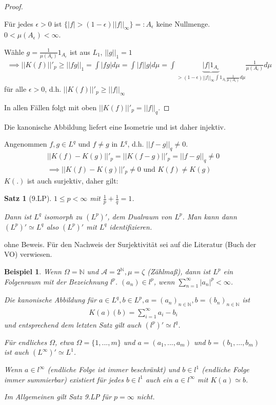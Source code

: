 \documentclass[]{article}
\newtheorem{theorem}{Satz}
\newtheorem*{example}{Beispiel}
\begin{document}
\begin{proof}
\begin{enumerate}
		Für jedes $\epsilon > 0$ ist $\{|f| > (1-\epsilon) ||f||_\infty\}=:A_\epsilon$ keine Nullmenge. $0 < \mu(A_\epsilon) < \infty$.
		
		Wähle $g=\frac{1}{\mu(A_\epsilon)}1_{A_\epsilon}$ ist aus $L_1$, $||g||_1=1$
		\begin{align*}
			\implies ||K(f)||'_p \geq ||fg||_1 = \int |fg| d\mu = \int |f| |g| d\mu = \int \underbrace{|f| 1_{A_\epsilon}}_{>(1-\epsilon)||f||_\infty \int 1_{A_\epsilon} \frac{1}{\mu(A_\epsilon)} d\mu} \frac{1}{\mu(A_\epsilon)} d\mu
		\end{align*}
		für alle $\epsilon > 0$, d.h. $||K(f)||'_p \geq ||f||_\infty$
	\end{enumerate}
	In allen Fällen folgt mit oben $||K(f)||'_p = ||f||_q$.

\end{proof}

Die kanonische Abbildung liefert eine Isometrie und ist daher injektiv.

Angenommen $f,g \in L^q$ und $f\neq g$ in $L^q$, d.h. $||f-g||_q \neq 0$.
\begin{align*}
	||K(f)-K(g)||'_p = ||K(f-g)||'_p = ||f-g||_q \neq 0\\
	\implies ||K(f)-K(g)||'_p \neq 0 \text{ und } K(f) \neq K(g)
\end{align*}
$K(.)$ ist auch surjektiv, daher gilt:

\begin{theorem}[9.LP]
	$1\leq p < \infty$ mit $\frac{1}{p} + \frac{1}{q} = 1$.
	
	Dann ist $L^q$ isomorph zu $(L^p)'$, dem Dualraum von $L^p$. Man kann dann $(L^p)' \simeq L^q$ also $(L^p)'$ mit $L^q$ identifizieren.
\end{theorem}

ohne Beweis. Für den Nachweis der Surjektivität sei auf die Literatur (Buch der VO) verwiesen.

\begin{example}
	Wenn $\Omega = \mathbb{N}$ und $\mathcal{A}=2^\mathbb{N}, \mu = \zeta$ (Zählmaß), dann ist $L^p$ ein Folgenraum mit der Bezeichnung $l^p$. $(a_n)\in l^p$, wenn $\sum_{n=1}^{\infty}|a_n|^p < \infty$.
	
	Die kanonische Abbildung für $a \in L^q, b \in L^p, a=(a_n)_{n\in \mathbb{N}}, b = (b_n)_{n\in \mathbb{N}}$ ist
	\begin{align*}
		K(a)(b) = \sum_{i=1}^{\infty} a_i - b_i
	\end{align*}
	und entsprechend dem letzten Satz gilt auch $(l^p)' \simeq l^q$.
	
	Für endliches $\Omega$, etwa $\Omega = \{1,...,m\}$ und $a=(a_1,...,a_m)$ und $b=(b_1,...,b_m)$ ist auch $(L^\infty)' \simeq L^1$.
	
	Wenn $a\in l^\infty$ (endliche Folge ist immer beschränkt) und $b \in l^1$ (endliche Folge immer summierbar) existiert für jedes $b \in l^1$ auch ein $a\in l^\infty$ mit $K(a) \simeq b$.
	
	Im Allgemeinen gilt Satz 9.LP für $p = \infty$ nicht.
\end{example}
\end{document}
